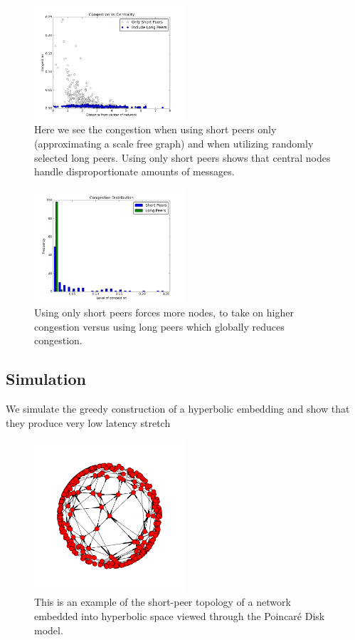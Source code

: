 \begin{figure}
	\includegraphics[width=0.5\textwidth]{radius_vs_load}
	\caption{Here we see the congestion when using short peers only (approximating a scale free graph) and when utilizing randomly selected long peers.
		Using only short peers shows that central nodes handle disproportionate amounts of messages.
	}
\end{figure}

\begin{figure}
	\includegraphics[width=0.5\textwidth]{congestion_4}
	\caption{Using only short peers forces more nodes, to take on higher congestion versus using long peers which globally reduces congestion.
	}
\end{figure}

\subsection{Simulation}

We simulate the greedy construction of a hyperbolic embedding and show that they produce very low latency stretch

\begin{figure}
	\includegraphics[width=0.5\textwidth]{disk}
	\caption{
		This is an example of the short-peer topology of a network embedded into hyperbolic space viewed through the Poincaré Disk model.
	}
\end{figure}


